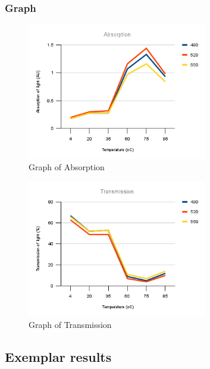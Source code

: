 \documentclass{thomasClass}
\begin{document}
\subsubsection{Graph}
\begin{figure}[H]
    \centering
    \includegraphics[width=0.7\textwidth]{RPA4-GRAPH1.png}
    \caption{Graph of Absorption}
\end{figure}
\begin{figure}[H]
    \centering
    \includegraphics[width=0.7\textwidth]{RPA4-GRAPH2.png}
    \caption{Graph of Transmission}
\end{figure}

\subsection{Exemplar results}
\end{document}
